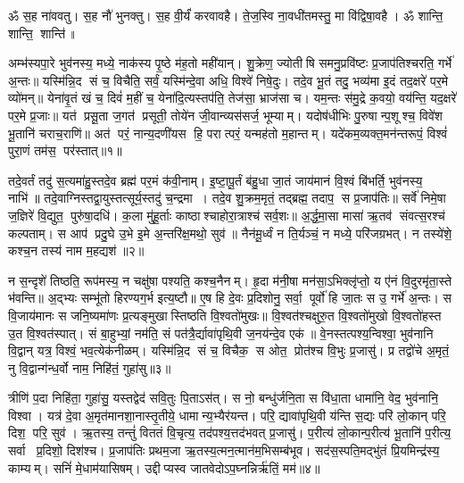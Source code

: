 \setcounter{anuvakam}{0}
ॐ स॒ह ना॑ववतु। स॒ह नौ॑ भुनक्तु। स॒ह वी॒र्यं॑ करवावहै। ते॒ज॒स्वि ना॒वधी॑तमस्तु॒ मा वि॑द्विषा॒वहै। ॐ शान्ति॒ शान्ति॒ शान्ति॑॥

अम्भ॑स्यपा॒रे भुव॑नस्य॒ मध्ये॒ नाक॑स्य पृ॒ष्ठे म॑ह॒तो मही॑यान्। शु॒क्रेण॒ ज्योतीषि समनु॒प्रवि॑ष्टः प्र॒जाप॑तिश्चरति॒ गर्भे॑ अ॒न्तः॥ यस्मि॑न्नि॒द सं च॒ विचैति॒ सर्वं॒ यस्मि॑न्दे॒वा अधि॒ विश्वे॑ निषे॒दुः। तदे॒व भू॒तं तदु॒ भव्य॑मा इ॒दं तद॒क्षरे॑ पर॒मे व्यो॑मन्॥ येना॑वृ॒तं खं च॒ दिवं॑ म॒हीं च॒ येना॑दि॒त्यस्तप॑ति॒ तेज॑सा॒ भ्राज॑सा च। यम॒न्तः स॑मु॒द्रे क॒वयो॒ वय॑न्ति॒ यद॒क्षरे॑ पर॒मे प्र॒जाः॥ यत॑ प्रसू॒ता ज॒गत॑ प्रसूती॒ तोये॑न जी॒वान्व्यस॑सर्ज॒ भूम्याम्। यदोष॑धीभिः पु॒रुषान्प॒शूश्च॒ विवे॑श भू॒तानि॑ चराच॒राणि॑॥ अत॑ परं॒ नान्य॒दणी॑यस हि॒ परात्परं॒ यन्मह॑तो म॒हान्तम्। यदे॑कम॒व्यक्त॒मन॑न्तरूपं॒ विश्वं॑ पुरा॒णं तम॑स॒ पर॑स्तात्॥१॥

तदे॒वर्तं तदु॑ स॒त्यमा॑हु॒स्तदे॒व ब्रह्म॑ पर॒मं क॑वी॒नाम्। इ॒ष्टा॒पू॒र्तं ब॑हु॒धा जा॒तं जाय॑मानं वि॒श्वं बि॑भर्ति॒ भुव॑नस्य॒ नाभि॑॥ तदे॒वाग्निस्तद्वा॒युस्तत्सूर्य॒स्तदु॑ च॒न्द्रमा। तदे॒व शु॒क्रम॒मृतं॒ तद्ब्रह्म॒ तदाप॒ स प्र॒जाप॑तिः॥ सर्वे॑ निमे॒षा ज॒ज्ञिरे॑ वि॒द्युत॒ पुरु॑षा॒दधि॑। क॒ला मु॑हू॒र्ताः काष्ठाश्चाहोरा॒त्राश्च॑ सर्व॒शः॥ अ॒र्द्ध॒मा॒सा मासा॑ ऋ॒तव॑ संवत्स॒रश्च॑ कल्पताम्। स आप॑ प्रदु॒घे उ॒भे इ॒मे अ॒न्तरि॑क्ष॒मथो॒ सुव॑॥ नैन॑मू॒र्ध्वं न ति॒र्यञ्चं॒ न मध्ये॒ परि॑जग्रभत्। न तस्ये॑शे॒ कश्च॒न तस्य॑ नाम म॒हद्यश॑॥२॥

न स॒न्दृशे॑ तिष्ठति॒ रूप॑मस्य॒ न चक्षु॑षा पश्यति॒ कश्च॒नैनम्। हृ॒दा म॑नी॒षा मन॑सा॒ऽभिक्लृ॑प्तो॒ य ए॑नं वि॒दुरमृ॑ता॒स्ते भ॑वन्ति॥ अ॒द्भ्यः सम्भू॑तो हिरण्यग॒र्भ इत्य॒ष्टौ॥ ए॒ष हि दे॒वः प्र॒दिशोनु॒ सर्वा॒ पूर्वो॑ हि जा॒तः स उ॒ गर्भे॑ अ॒न्तः। स वि॒जाय॑मानः स जनि॒ष्यमा॑णः प्र॒त्यङ्मुखास्तिष्ठति वि॒श्वतो॑मुखः॥ वि॒श्वत॑श्चक्षुरु॒त वि॒श्वतो॑मुखो वि॒श्वतो॑हस्त उ॒त वि॒श्वत॑स्पात्। सं बा॒हुभ्यां॒ नम॑ति॒ सं पत॑त्रै॒र्द्यावा॑पृथि॒वी ज॒नय॑न्दे॒व एक॑॥ वे॒नस्तत्पश्य॒न्विश्वा॒ भुव॑नानि वि॒द्वान् यत्र॒ विश्वं॒ भव॒त्येक॑नीळम्। यस्मि॑न्नि॒द सं च॒ विचैक॒ स ओत॒ प्रोत॑श्च वि॒भुः प्र॒जासु॑। प्र तद्वो॑चे अ॒मृतं॒ नु वि॒द्वान्ग॑न्ध॒र्वो नाम॒ निहि॑तं॒ गुहा॑सु॥३॥

त्रीणि॑ प॒दा निहि॑ता॒ गुहा॑सु॒ यस्तद्वेद॑ सवि॒तुः पि॒ताऽस॑त्। स नो॒ बन्धु॑र्जनि॒ता स वि॑धा॒ता धामा॑नि॒ वेद॒ भुव॑नानि॒ विश्वा। यत्र॑ दे॒वा अ॒मृत॑मानशा॒नास्तृ॒तीये॒ धामान्य॒भ्यैर॑यन्त। परि॒ द्यावा॑पृथि॒वी य॑न्ति स॒द्यः परि॑ लो॒कान् परि॒ दिश॒ परि॒ सुव॑। ऋ॒तस्य॒ तन्तुं॑ विततं वि॒चृत्य॒ तद॑पश्य॒त्तद॑भवत् प्र॒जासु॑। प॒रीत्य॑ लो॒कान्प॒रीत्य॑ भू॒तानि॑ प॒रीत्य॒ सर्वा प्र॒दिशो॒ दिश॑श्च। प्र॒जाप॑तिः प्रथम॒जा ऋ॒तस्य॒\aav{}\aav{}त्मन॒\aav{}\aav{}त्मान॑म॒भिसम्ब॑भूव। सद॑स॒स्पति॒मद्भु॑तं प्रि॒यमिन्द्र॑स्य॒ काम्यम्। सनिं॑ मे॒धाम॑यासिषम्। उद्दीप्यस्व जातवेदोऽप॒घ्नन्निर्\mbox{}ऋ॑तिं॒ मम॑॥४॥


